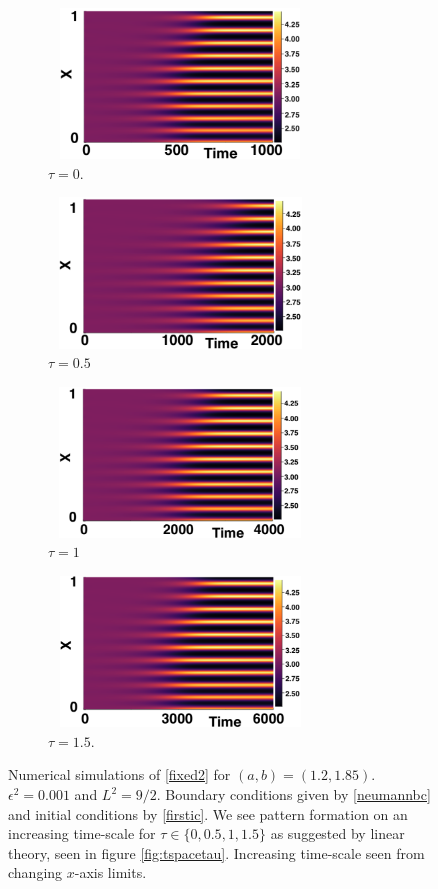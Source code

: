 \begin{figure}[H]
    \centering
    \begin{subfigure}[b]{0.45\textwidth}
        \centering
        \includegraphics[width=7cm,height=4cm]{p2t0.png}
        \caption{$\tau=0$.}
        \label{}
    \end{subfigure}
    \hfill
    \begin{subfigure}[b]{0.45\textwidth}
        \centering
        \includegraphics[width=7cm,height=4cm]{p2t05.png}
        \caption{$\tau=0.5$}
        \label{}
    \end{subfigure}
    \hfill
    \begin{subfigure}[b]{0.45\textwidth}
        \centering
        \includegraphics[width=7cm,height=4cm]{p2t1.png}
        \caption{$\tau=1$}
        \label{}
    \end{subfigure}
    \hfill
    \begin{subfigure}[b]{0.45\textwidth}
        \centering
        \includegraphics[width=7cm,height=4cm]{p2t15.png}
        \caption{$\tau=1.5$.}
        \label{}
    \end{subfigure}
    \caption{Numerical simulations of \eqref{fixed2} for $(a,b)=(1.2,1.85)$. $\epsilon^2=0.001$ and $L^2=9/2$. Boundary conditions given by \eqref{neumannbc} and initial conditions by \eqref{firstic}. We see pattern formation on an increasing time-scale for $\tau\in\{0,0.5,1,1.5\}$ as suggested by linear theory, seen in figure \ref{fig:tspacetau}. Increasing time-scale seen from changing $x$-axis limits.}
    \label{fig:testturing3}
\end{figure}

